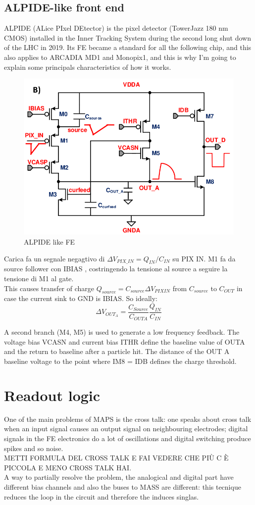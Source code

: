 \subsection{ALPIDE-like front end}
ALPIDE (ALice PIxel DEtector) is the pixel detector (TowerJazz 180 nm CMOS) installed in the 
Inner Tracking System during the second long shut down of the LHC in 2019. Its FE became a
standard for all the following chip, and this also applies to ARCADIA MD1 and Monopix1, and this 
is why I'm going to explain some principals characteristics of how it works. 
\begin{figure}[h!]
   \centering
   \includegraphics[width=.7\linewidth]{figures/ALPIDE_FE.png}
   \caption{ALPIDE like FE}
   \label{fig:ALPIDE-like}
\end{figure}
Carica fa un segnale negagtivo di $\Delta V_{PIX\_IN} = Q_{IN}/C_{IN}$ su PIX IN. 
M1 fa da source follower con IBIAS , costringendo la tensione al source a seguire la tensione di M1
al gate. \\
This causes transfer of charge 
$Q_{source}=C_{source}\Delta V_{PIXIN}$ from $C_{source}$ to $C_{OUT}$ in case the current sink
to GND is IBIAS.
So ideally:
\begin{equation}
   \Delta V_{OUT_A} = \frac{C_{Source}}{C_{OUTA}}\frac{Q_{IN}}{C_{IN}}
\end{equation}

A second branch (M4, M5) is used to generate a low frequency feedback. 
The voltage bias
VCASN and current bias ITHR define the baseline value of OUTA and the return to baseline after
a particle hit. The distance of the OUT A baseline voltage to the point where
IM8 = IDB defines the charge threshold.
  
\section{Readout logic}
One of the main problems of MAPS is the cross talk: one speaks about cross talk
when an input signal causes an output signal on neighbouring electrodes; digital signals
in the FE electronics do a lot of oscillations and digital switching produce spikes
and so noise.\\
METTI FORMULA DEL CROSS TALK E FAI VEDERE CHE PIÙ C È PICCOLA E MENO CROSS TALK HAI.\\
A way to partially resolve the problem, the analogical and digital part have different
bias channels and also the buses to MASS are different: this tecnique reduces the
loop in the circuit and therefore the induces singlas.\\


